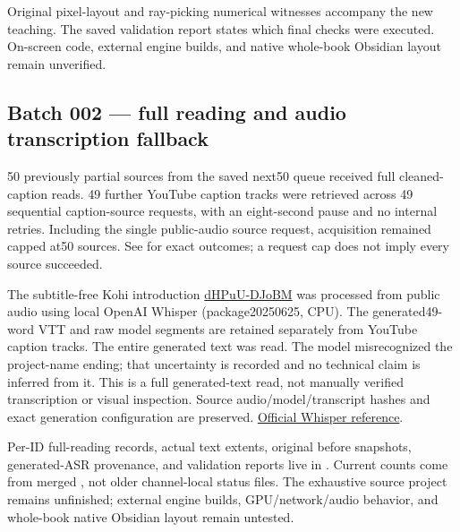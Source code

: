 Original pixel-layout and ray-picking numerical witnesses accompany the new teaching. The saved validation report states which final checks were executed. On-screen code, external engine builds, and native whole-book Obsidian layout remain unverified.

\subsection{Batch 002 --- full reading and audio transcription fallback}\label{appendix-877738f6f4d2-batch-002-full-reading-and-audio-transcription-fallback}

\hypertarget{appendix-877738f6f4d2-batch-002-full-reading-and-audio-transcription-fallback}{}

50 previously partial sources from the saved next50 queue received full cleaned-caption reads. 49 further YouTube caption tracks were retrieved across 49 sequential caption-source requests, with an eight-second pause and no internal retries. Including the single public-audio source request, acquisition remained capped at50 sources. See  for exact outcomes; a request cap does not imply every source succeeded.

The subtitle-free Kohi introduction \href{https://www.youtube.com/watch?v=dHPuU-DJoBM}{dHPuU-DJoBM} was processed from public audio using local OpenAI Whisper  (package20250625, CPU). The generated49-word VTT and raw model segments are retained separately from YouTube caption tracks. The entire generated text was read. The model misrecognized the project-name ending; that uncertainty is recorded and no technical claim is inferred from it. This is a full generated-text read, not manually verified transcription or visual inspection. Source audio/model/transcript hashes and exact generation configuration are preserved. \href{https://github.com/openai/whisper}{Official Whisper reference}.

Per-ID full-reading records, actual text extents, original before snapshots, generated-ASR provenance, and validation reports live in . Current counts come from merged , not older channel-local status files. The exhaustive source project remains unfinished; external engine builds, GPU/network/audio behavior, and whole-book native Obsidian layout remain untested.

